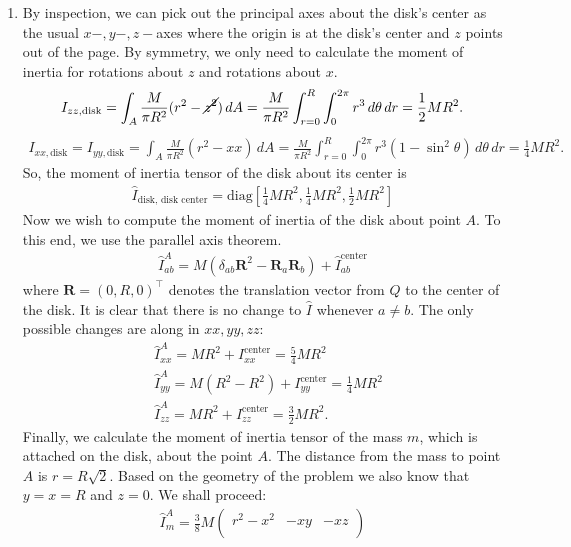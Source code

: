 \documentclass{article}
\theoremstyle{definition}
\newcommand{\f}[2]{\frac{#1}{#2}}
\newcommand{\lb}{\left[}
\newcommand{\rb}{\right]}
\begin{document}
\begin{enumerate}[label=(\alph*)]
	\item By inspection, we can pick out the principal axes about the disk's center as the usual $x-,y-,z-$axes where the origin is at the disk's center and $z$ points out of the page. By symmetry, we only need to calculate the moment of inertia for rotations about $z$ and rotations about $x$. 
	\begin{align*}
	I_{zz,\text{disk}} = \int_A \f{M}{\pi R^2} (r^2 - \cancel{z^2})\,dA = \f{M}{\pi R^2}\int_{r=0}^R \int_{0}^{2\pi} r^3 \,d\theta\,dr = \f{1}{2}MR^2.
	\end{align*}
	\begin{align*}
	I_{xx,\text{disk}} = I_{yy,\text{disk}} = \int_A \f{M}{\pi R^2}(r^2 - xx)\,dA = \f{M}{\pi R^2}\int_{r=0}^R \int_{0}^{2\pi} r^3(1-\sin^2\theta)\,d\theta \,dr  = \f{1}{4}MR^2.
	\end{align*}
	So, the moment of inertia tensor of the disk about its center is 
	\begin{align*}
	\boxed{\hat I_{\text{disk, disk center}} = \text{diag}\lb \f{1}{4}MR^2, \f{1}{4}MR^2, \f{1}{2}MR^2 \rb}
	\end{align*}
	Now we wish to compute the moment of inertia of the disk about point $A$. To this end, we use the parallel axis theorem. 
	\begin{align*}
	\hat I_{ab}^A = M(\delta_{ab}\mathbf{R}^2 - \mathbf{R}_a \mathbf{R}_b) + \hat I_{ab}^{\text{center}}
	\end{align*}
	where $\mathbf{R} = (0,R,0)^\top$ denotes the translation vector from $Q$ to the center of the disk. It is clear that there is no change to $\hat I$ whenever $a\neq b$. The only possible changes are along in $xx,yy,zz$:
	\begin{align*}
	&\hat I_{xx}^A = MR^2 + I_{xx}^{\text{center}} = \f{5}{4}MR^2\\
	&\hat I_{yy}^A = M(R^2-R^2) + I_{yy}^{\text{center}} = \f{1}{4}MR^2\\
	&\hat I_{zz}^A = MR^2 + I_{zz}^{\text{center}} = \f{3}{2}MR^2.
	\end{align*}
	Finally, we calculate the moment of inertia tensor of the mass $m$, which is attached on the disk, about the point $A$. The distance from the mass to point $A$ is $r = R\sqrt{2}$. Based on the geometry of the problem we also know that $y=x=R$ and $z=0$. We shall proceed:
	\begin{align*}
	\hat I_m^{A} = \f{3}{8}M\begin{pmatrix}
	r^2-x^2 & -xy & -xz\\

\end{pmatrix}
\end{align*}
\end{enumerate}
\end{document}
